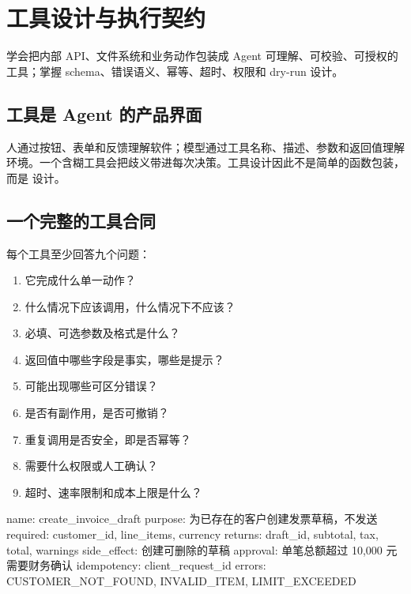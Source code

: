 \chapter{工具设计与执行契约}
\label{chap:tools}

\begin{takeaway}[学习目标]
学会把内部 API、文件系统和业务动作包装成 Agent 可理解、可校验、可授权的工具；掌握 schema、错误语义、幂等、超时、权限和 dry-run 设计。
\end{takeaway}

\section{工具是 Agent 的产品界面}

人通过按钮、表单和反馈理解软件；模型通过工具名称、描述、参数和返回值理解环境。一个含糊工具会把歧义带进每次决策。工具设计因此不是简单的函数包装，而是  设计。

\section{一个完整的工具合同}

每个工具至少回答九个问题：

\begin{enumerate}
  \item 它完成什么单一动作？
  \item 什么情况下应该调用，什么情况下不应该？
  \item 必填、可选参数及格式是什么？
  \item 返回值中哪些字段是事实，哪些是提示？
  \item 可能出现哪些可区分错误？
  \item 是否有副作用，是否可撤销？
  \item 重复调用是否安全，即是否幂等？
  \item 需要什么权限或人工确认？
  \item 超时、速率限制和成本上限是什么？
\end{enumerate}

\begin{codeblock}
name: create_invoice_draft
purpose: 为已存在的客户创建发票草稿，不发送
required: customer_id, line_items, currency
returns: draft_id, subtotal, tax, total, warnings
side_effect: 创建可删除的草稿
approval: 单笔总额超过 10,000 元需要财务确认
idempotency: client_request_id
errors: CUSTOMER_NOT_FOUND, INVALID_ITEM, LIMIT_EXCEEDED
\end{codeblock}


